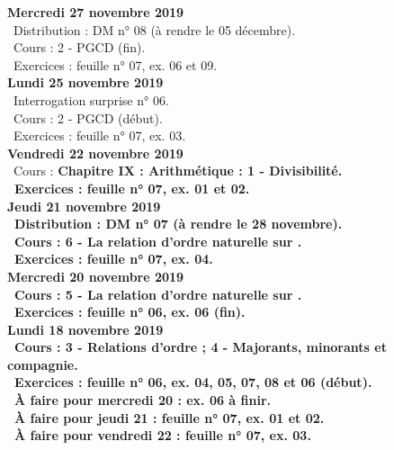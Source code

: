 \documentclass[12pt,a4paper]{article}
\begin{document}
\noindent\textbf{\bf Mercredi 27 novembre 2019}\\
\bu\ Distribution : DM n° 08 (à rendre le 05 décembre).\\
\bu\ Cours : 2 - PGCD (fin).\\
\bu\ Exercices : feuille n° 07, ex. 06 et 09.\vspace{.4cm}\\

\noindent\textbf{Lundi 25 novembre 2019}\\
\bu\ Interrogation surprise n° 06.\\
\bu\ Cours : 2 - PGCD (début).\\
\bu\ Exercices : feuille n° 07, ex. 03.\vspace{.4cm}\\ 

\noindent\textbf{Vendredi 22 novembre 2019}\\
\bu\ Cours : \bf Chapitre IX \rm : Arithmétique : 1 - Divisibilité.\\
\bu\ Exercices : feuille n° 07, ex. 01 et 02.\vspace{.4cm}\\ 

\noindent\textbf{Jeudi 21 novembre 2019}\\
\bu\ Distribution : DM n° 07 (à rendre le 28 novembre).\\
\bu\ Cours : 6 - La relation d'ordre naturelle sur \R.\\
\bu\ Exercices : feuille n° 07, ex. 04.\vspace{.4cm}\\ 

\noindent\textbf{\bf Mercredi 20 novembre 2019}\\
\bu\ Cours : 5 - La relation d'ordre naturelle sur \N.\\
\bu\ Exercices : feuille n° 06, ex. 06 (fin).\vspace{.4cm}\\ 

\noindent\textbf{Lundi 18 novembre 2019}\\
\bu\ Cours : 3 - Relations d'ordre ;  4 - Majorants, minorants et compagnie.\\
\bu\ Exercices : feuille n° 06, ex. 04, 05, 07, 08 et 06 (début).\\ 
\bu\ À faire pour mercredi 20 : ex. 06 à finir.\\
\bu\ À faire pour jeudi 21 : feuille n° 07, ex. 01 et 02.\\
\bu\ À faire pour vendredi 22 : feuille n° 07, ex. 03.\vspace{.4cm}\\
\end{document}
